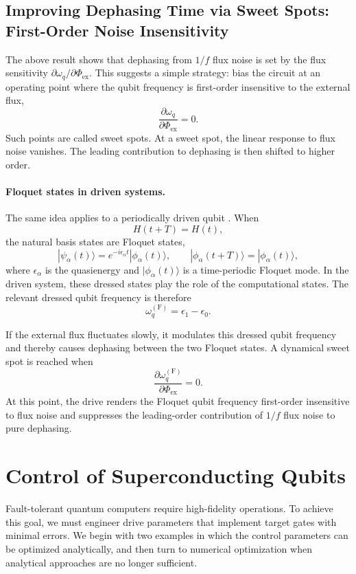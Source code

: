 \subsection{Improving Dephasing Time via Sweet Spots: First-Order Noise Insensitivity}
\label{subsec:sweet-spots}

The above result shows that dephasing from \(1/f\) flux noise is set by the flux sensitivity \(\partial \omega_q/\partial \Phi_{\mathrm{ex}}\). This suggests a simple strategy: bias the circuit at an operating point where the qubit frequency is first-order insensitive to the external flux,
\[
\frac{\partial \omega_q}{\partial \Phi_{\mathrm{ex}}}=0.
\]
Such points are called sweet spots. At a sweet spot, the linear response to flux noise vanishes. The leading contribution to dephasing is then shifted to higher order.

\paragraph{Floquet states in driven systems.}\label{sec:floquet}
The same idea applies to a periodically driven qubit \cite{Huang2021DynamicalSweetSpots,Valery2022DynamicalSweetSpot}. When
\[
H(t+T)=H(t),
\]
the natural basis states are Floquet states,
\[
|\psi_\alpha(t)\rangle
=
e^{-i\epsilon_\alpha t}
|\phi_\alpha(t)\rangle,
\qquad
|\phi_\alpha(t+T)\rangle = |\phi_\alpha(t)\rangle,
\]
where \(\epsilon_\alpha\) is the quasienergy and \(|\phi_\alpha(t)\rangle\) is a time-periodic Floquet mode. In the driven system, these dressed states play the role of the computational states. The relevant dressed qubit frequency is therefore
\[
\omega_q^{(\mathrm{F})}=\epsilon_1-\epsilon_0.
\]

If the external flux fluctuates slowly, it modulates this dressed qubit frequency and thereby causes dephasing between the two Floquet states. A dynamical sweet spot is reached when
\[
\frac{\partial \omega_q^{(\mathrm{F})}}{\partial \Phi_{\mathrm{ex}}}=0.
\]
At this point, the drive renders the Floquet qubit frequency first-order insensitive to flux noise and suppresses the leading-order contribution of \(1/f\) flux noise to pure dephasing.

\section{Control of Superconducting Qubits}
\label{sec:analyticalcontrol}

Fault-tolerant quantum computers require high-fidelity operations. To achieve this goal, we must engineer drive parameters that implement target gates with minimal errors. We begin with two examples in which the control parameters can be optimized analytically, and then turn to numerical optimization when analytical approaches are no longer sufficient.
